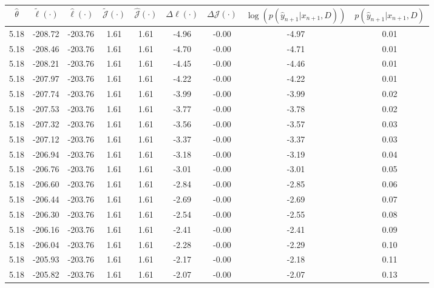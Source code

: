 \begin{table}[htbp]
        \centering
        \tiny
        \begin{adjustbox}{angle=90}
            \begin{tabular}{|c|c|c|c|c|c|c|c|c|}
                \hline
                 $\hat{\theta}$ & $\tilde{\ell}(\cdot)$ & $\hat{\ell}(\cdot)$ & $\tilde{\mathcal{J}}(\cdot)$ & $\hat{\mathcal{J}}(\cdot)$ & $\Delta \ell(\cdot)$ & $\Delta \mathcal{J}(\cdot)$ & $\log(p(\hat{y}_{n+1}|x_{n+1}, D))$ & $p(\hat{y}_{n+1}|x_{n+1}, D)$ \\
                \hline
                 5.18 & -208.72 & -203.76 & 1.61 & 1.61 & -4.96 & -0.00 & -4.97 & 0.01\\ \hline
 5.18 & -208.46 & -203.76 & 1.61 & 1.61 & -4.70 & -0.00 & -4.71 & 0.01\\ \hline
 5.18 & -208.21 & -203.76 & 1.61 & 1.61 & -4.45 & -0.00 & -4.46 & 0.01\\ \hline
 5.18 & -207.97 & -203.76 & 1.61 & 1.61 & -4.22 & -0.00 & -4.22 & 0.01\\ \hline
 5.18 & -207.74 & -203.76 & 1.61 & 1.61 & -3.99 & -0.00 & -3.99 & 0.02\\ \hline
 5.18 & -207.53 & -203.76 & 1.61 & 1.61 & -3.77 & -0.00 & -3.78 & 0.02\\ \hline
 5.18 & -207.32 & -203.76 & 1.61 & 1.61 & -3.56 & -0.00 & -3.57 & 0.03\\ \hline
 5.18 & -207.12 & -203.76 & 1.61 & 1.61 & -3.37 & -0.00 & -3.37 & 0.03\\ \hline
 5.18 & -206.94 & -203.76 & 1.61 & 1.61 & -3.18 & -0.00 & -3.19 & 0.04\\ \hline
 5.18 & -206.76 & -203.76 & 1.61 & 1.61 & -3.01 & -0.00 & -3.01 & 0.05\\ \hline
 5.18 & -206.60 & -203.76 & 1.61 & 1.61 & -2.84 & -0.00 & -2.85 & 0.06\\ \hline
 5.18 & -206.44 & -203.76 & 1.61 & 1.61 & -2.69 & -0.00 & -2.69 & 0.07\\ \hline
 5.18 & -206.30 & -203.76 & 1.61 & 1.61 & -2.54 & -0.00 & -2.55 & 0.08\\ \hline
 5.18 & -206.16 & -203.76 & 1.61 & 1.61 & -2.41 & -0.00 & -2.41 & 0.09\\ \hline
 5.18 & -206.04 & -203.76 & 1.61 & 1.61 & -2.28 & -0.00 & -2.29 & 0.10\\ \hline
 5.18 & -205.93 & -203.76 & 1.61 & 1.61 & -2.17 & -0.00 & -2.18 & 0.11\\ \hline
 5.18 & -205.82 & -203.76 & 1.61 & 1.61 & -2.07 & -0.00 & -2.07 & 0.13\\ \hline

\end{tabular}
\end{adjustbox}
\end{table}
